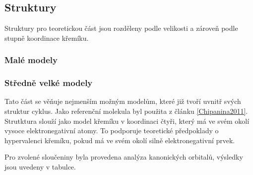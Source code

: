\documentclass[
  digital, %
  table,   %
  lof,     %
  lot,     %
]{fithesis3}
\begin{document}
\subsection{Struktury}
Struktury pro teoretickou část jsou rozděleny podle velikosti a zároveň podle stupně koordinace křemíku.
\subsubsection{Malé modely}

\subsubsection{Středně velké modely}
Tato část se věňuje nejmenším možným modelům, které již tvoří uvnitř svých struktur cyklus. Jako referenční molekula byl použita  z článku \ref{Chipanina2011}. Strutktura  slouží jako model křemíku v koordinaci čtyři, který má ve svém okolí vysoce elektronegativní atomy. To podporuje teoretické předpoklady o hypervalenci křemíku, pokud má ve svém okolí silně elektronegativní prvek.
\begin{figure}
\begin{center}
\caption{}

\label{obr_h4sio4_vysledky_I}



\end{center}
\end{figure}
Pro zvolené sloučeniny byla provedena analýza kanonických orbitalů, výsledky jsou uvedeny v tabulce.
\end{document}
